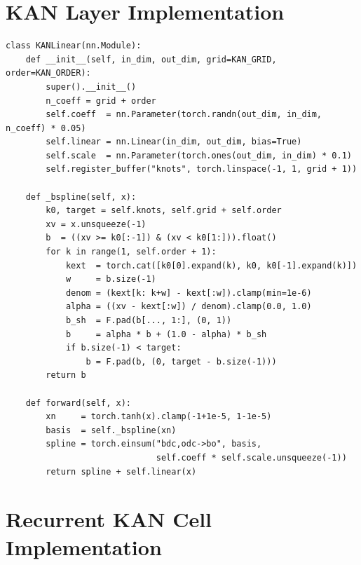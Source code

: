 \documentclass[12pt,a4paper]{report}
\begin{document}
\appendix

\chapter{KAN Layer Implementation}

\begin{lstlisting}[style=pythonstyle, caption={KANLinear --- B-spline based KAN layer (kan\_layer.py)}]
class KANLinear(nn.Module):
    def __init__(self, in_dim, out_dim, grid=KAN_GRID, order=KAN_ORDER):
        super().__init__()
        n_coeff = grid + order
        self.coeff  = nn.Parameter(torch.randn(out_dim, in_dim, n_coeff) * 0.05)
        self.linear = nn.Linear(in_dim, out_dim, bias=True)
        self.scale  = nn.Parameter(torch.ones(out_dim, in_dim) * 0.1)
        self.register_buffer("knots", torch.linspace(-1, 1, grid + 1))

    def _bspline(self, x):
        k0, target = self.knots, self.grid + self.order
        xv = x.unsqueeze(-1)
        b  = ((xv >= k0[:-1]) & (xv < k0[1:])).float()
        for k in range(1, self.order + 1):
            kext  = torch.cat([k0[0].expand(k), k0, k0[-1].expand(k)])
            w     = b.size(-1)
            denom = (kext[k: k+w] - kext[:w]).clamp(min=1e-6)
            alpha = ((xv - kext[:w]) / denom).clamp(0.0, 1.0)
            b_sh  = F.pad(b[..., 1:], (0, 1))
            b     = alpha * b + (1.0 - alpha) * b_sh
            if b.size(-1) < target:
                b = F.pad(b, (0, target - b.size(-1)))
        return b

    def forward(self, x):
        xn     = torch.tanh(x).clamp(-1+1e-5, 1-1e-5)
        basis  = self._bspline(xn)
        spline = torch.einsum("bdc,odc->bo", basis,
                              self.coeff * self.scale.unsqueeze(-1))
        return spline + self.linear(x)
\end{lstlisting}

\chapter{Recurrent KAN Cell Implementation}
\end{document}
